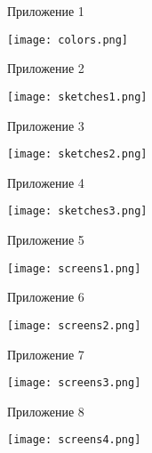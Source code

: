 \documentclass[../document.tex]{subfiles}
\begin{document}
\par Приложение 1

\texttt{[image: colors.png]}

\par Приложение 2

\texttt{[image: sketches1.png]}

\par Приложение 3

\texttt{[image: sketches2.png]}

\par Приложение 4

\texttt{[image: sketches3.png]}

\par Приложение 5

\texttt{[image: screens1.png]}

\par Приложение 6

\texttt{[image: screens2.png]}

\par Приложение 7

\texttt{[image: screens3.png]}

\par Приложение 8

\texttt{[image: screens4.png]}
\end{document}
